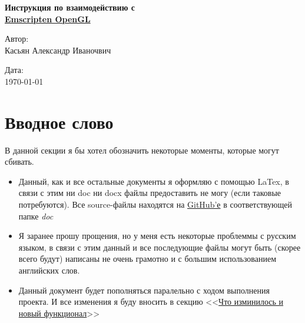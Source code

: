 \documentclass[12pt]{article}
\begin{document}
    \begin{titlepage}
    \center %
    \newcommand{\HRline}[1]{\rule{\linewidth}{#1}} %
    \vspace*{\fill}
    \textbf{\LARGE Инструкция по взаимодействию с \\ \href{https://github.com/JuiceFV/Emscripten_OpenGL}{Emscripten OpenGL}}
    \vspace*{\fill}
    \begin{multicols}{2}
        \begin{flushleft}
            \large Автор: \\
            \large Касьян Александр Иваночвич
        \end{flushleft}

        
        \columnbreak
        \begin{flushright}
            \large Дата:\\
            \large {\large \today}
        \end{flushright}
    \end{multicols}
    \end{titlepage}

    \newpage

    \tableofcontents

    \newpage
    \section{Вводное слово}
    В данной секции я бы хотел обозначить некоторые моменты, которые могут
    сбивать.
    \begin{itemize}
        \item Данный, как и все остальные документы я оформляю с помощью 
        LaTex, в связи с этим ни doc ни docx файлы предоставить не могу 
        (если таковые потребуются). Все source-файлы находятся на 
        \href{https://github.com/JuiceFV/Emscripten_OpenGL}{GitHub'е}
        в соответствующей папке \emph{doc}
        \item Я заранее прошу прощения, но у меня есть некоторые проблеммы
        с русским языком, в связи с этим данный и все последующие файлы 
        могут быть (скорее всего будут) написаны не очень грамотно и с 
        большим использованием английских слов. 
        \item Данный документ будет пополняться паралельно с ходом выполнения
        проекта. И все изменения я буду вносить в секцию <<\hyperref[sec:fickle]{Что изминилось и новый функционал}>>
    \end{itemize}
    \newpage
\end{document}
